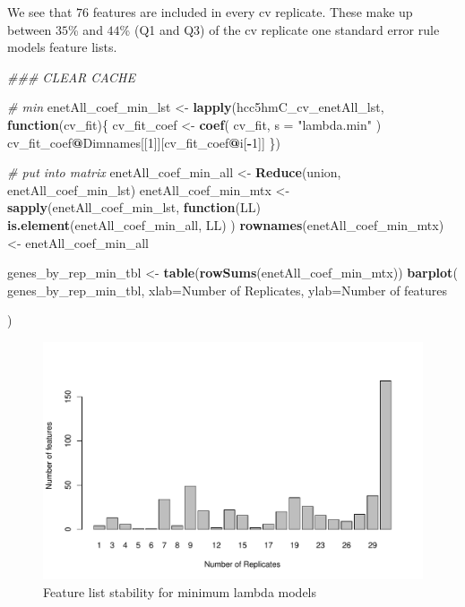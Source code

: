 \documentclass[
]{book}
\newenvironment{Shaded}{\begin{snugshade}}{\end{snugshade}}
\newcommand{\CommentTok}[1]{\textcolor[rgb]{0.56,0.35,0.01}{\textit{#1}}}
\newcommand{\ControlFlowTok}[1]{\textcolor[rgb]{0.13,0.29,0.53}{\textbf{#1}}}
\newcommand{\DataTypeTok}[1]{\textcolor[rgb]{0.13,0.29,0.53}{#1}}
\newcommand{\DecValTok}[1]{\textcolor[rgb]{0.00,0.00,0.81}{#1}}
\newcommand{\KeywordTok}[1]{\textcolor[rgb]{0.13,0.29,0.53}{\textbf{#1}}}
\newcommand{\NormalTok}[1]{#1}
\newcommand{\OperatorTok}[1]{\textcolor[rgb]{0.81,0.36,0.00}{\textbf{#1}}}
\newcommand{\StringTok}[1]{\textcolor[rgb]{0.31,0.60,0.02}{#1}}
\begin{document}
We see that \(76\) features are included in every
cv replicate. These make up between
\(35\)\%
and
\(44\)\%
(Q1 and Q3) of the cv replicate one standard error rule models feature lists.

\begin{Shaded}
\begin{Highlighting}[]
\CommentTok{\#\#\# CLEAR CACHE}


\CommentTok{\# min}
\NormalTok{enetAll\_coef\_min\_lst <{-}}\StringTok{ }\KeywordTok{lapply}\NormalTok{(hcc5hmC\_cv\_enetAll\_lst, }\ControlFlowTok{function}\NormalTok{(cv\_fit)\{}
\NormalTok{ cv\_fit\_coef <{-}}\StringTok{ }\KeywordTok{coef}\NormalTok{(}
\NormalTok{ cv\_fit,}
 \DataTypeTok{s =} \StringTok{"lambda.min"}
\NormalTok{ )}
\NormalTok{ cv\_fit\_coef}\OperatorTok{@}\NormalTok{Dimnames[[}\DecValTok{1}\NormalTok{]][cv\_fit\_coef}\OperatorTok{@}\NormalTok{i[}\OperatorTok{{-}}\DecValTok{1}\NormalTok{]]}
\NormalTok{ \})}

\CommentTok{\# put into matrix}
\NormalTok{enetAll\_coef\_min\_all <{-}}\StringTok{ }\KeywordTok{Reduce}\NormalTok{(union, enetAll\_coef\_min\_lst)}
\NormalTok{enetAll\_coef\_min\_mtx <{-}}\StringTok{ }\KeywordTok{sapply}\NormalTok{(enetAll\_coef\_min\_lst, }
  \ControlFlowTok{function}\NormalTok{(LL) }\KeywordTok{is.element}\NormalTok{(enetAll\_coef\_min\_all, LL)}
\NormalTok{)}
\KeywordTok{rownames}\NormalTok{(enetAll\_coef\_min\_mtx) <{-}}\StringTok{ }\NormalTok{enetAll\_coef\_min\_all}

\NormalTok{genes\_by\_rep\_min\_tbl <{-}}\StringTok{ }\KeywordTok{table}\NormalTok{(}\KeywordTok{rowSums}\NormalTok{(enetAll\_coef\_min\_mtx))}
\KeywordTok{barplot}\NormalTok{(}
\NormalTok{ genes\_by\_rep\_min\_tbl,}
 \DataTypeTok{xlab=}\StringTok{\textquotesingle{}Number of Replicates\textquotesingle{}}\NormalTok{,}
 \DataTypeTok{ylab=}\StringTok{\textquotesingle{}Number of features\textquotesingle{}}

\NormalTok{)}
\end{Highlighting}
\end{Shaded}

\begin{figure}
\centering
\includegraphics{Static/figures/hcc5hmC-glmnetSuiteB-enet-feature-list-min-1.pdf}
\caption{\label{fig:hcc5hmC-glmnetSuiteB-enet-feature-list-min}Feature list stability for minimum lambda models}
\end{figure}
\end{document}
